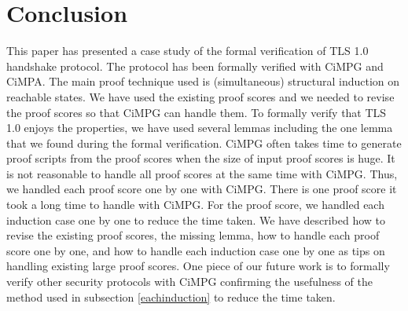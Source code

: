 \documentclass[a4paper,fleqn]{cas-dc}
\begin{document}
\section{Conclusion}\label{conclusion}
This paper has presented a case study of the formal verification of TLS 1.0 handshake protocol. The protocol has been formally verified with CiMPG and CiMPA. The main proof technique used is (simultaneous) structural induction on reachable states. We have used the existing proof scores and we needed to revise the proof scores so that CiMPG can handle them. To formally verify that TLS 1.0 enjoys the properties, we have used several lemmas including the one lemma that we found during the formal verification. CiMPG often takes time to generate proof scripts from the proof scores when the size of input proof scores is huge. It is not reasonable to handle all proof scores at the same time with CiMPG. Thus, we handled each proof score one by one with CiMPG. There is one proof score it took a long time to handle with CiMPG. For the proof score, we handled each induction case one by one to reduce the time taken. We have described how to revise the existing proof scores, the missing lemma, how to handle each proof score one by one, and how to handle each induction case one by one as tips on handling existing large proof scores. One piece of our future work is to formally verify other security protocols with CiMPG confirming the usefulness of the method used in subsection \ref{eachinduction} to reduce the time taken. 
      





\end{document}
